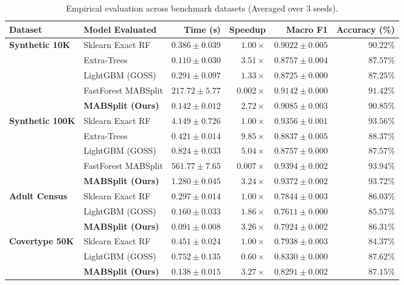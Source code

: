 \documentclass{article}
\begin{document}
	\begin{table}[htbp]
		\centering
		\small
		\caption{Empirical evaluation across benchmark datasets (Averaged over 3 seeds).}
		\label{tab:main_results}
		\begin{tabularx}{\textwidth}{llrrrr}
			\toprule
			\textbf{Dataset} & \textbf{Model Evaluated} & \textbf{Time (s)} & \textbf{Speedup} & \textbf{Macro F1} & \textbf{Accuracy (\%)} \\
			\midrule
			\textbf{Synthetic 10K} & Sklearn Exact RF & $0.386 \pm 0.039$ & $1.00\times$ & $0.9022 \pm 0.005$ & $90.22\%$ \\
			& Extra-Trees & $0.110 \pm 0.030$ & $3.51\times$ & $0.8757 \pm 0.004$ & $87.57\%$ \\
			& LightGBM (GOSS) & $0.291 \pm 0.097$ & $1.33\times$ & $0.8725 \pm 0.000$ & $87.25\%$ \\
			& FastForest MABSplit & $217.72 \pm 5.77$ & $0.002\times$ & $0.9142 \pm 0.000$ & $91.42\%$ \\
			& \textbf{MABSplit (Ours)} & $\mathbf{0.142 \pm 0.012}$ & $\mathbf{2.72\times}$ & $\mathbf{0.9085 \pm 0.003}$ & $\mathbf{90.85\%}$ \\
			\midrule
			\textbf{Synthetic 100K} & Sklearn Exact RF & $4.149 \pm 0.726$ & $1.00\times$ & $0.9356 \pm 0.001$ & $93.56\%$ \\
			& Extra-Trees & $0.421 \pm 0.014$ & $9.85\times$ & $0.8837 \pm 0.005$ & $88.37\%$ \\
			& LightGBM (GOSS) & $0.824 \pm 0.033$ & $5.04\times$ & $0.8757 \pm 0.000$ & $87.57\%$ \\
			& FastForest MABSplit & $561.77 \pm 7.65$ & $0.007\times$ & $0.9394 \pm 0.002$ & $93.94\%$ \\
			& \textbf{MABSplit (Ours)} & $\mathbf{1.280 \pm 0.045}$ & $\mathbf{3.24\times}$ & $\mathbf{0.9372 \pm 0.002}$ & $\mathbf{93.72\%}$ \\
			\midrule
			\textbf{Adult Census} & Sklearn Exact RF & $0.297 \pm 0.014$ & $1.00\times$ & $0.7844 \pm 0.003$ & $86.03\%$ \\
			& LightGBM (GOSS) & $0.160 \pm 0.033$ & $1.86\times$ & $0.7611 \pm 0.000$ & $85.57\%$ \\
			& \textbf{MABSplit (Ours)} & $\mathbf{0.091 \pm 0.008}$ & $\mathbf{3.26\times}$ & $\mathbf{0.7924 \pm 0.002}$ & $\mathbf{86.31\%}$ \\
			\midrule
			\textbf{Covertype 50K} & Sklearn Exact RF & $0.451 \pm 0.024$ & $1.00\times$ & $0.7938 \pm 0.003$ & $84.37\%$ \\
			& LightGBM (GOSS) & $0.752 \pm 0.135$ & $0.60\times$ & $0.8330 \pm 0.000$ & $87.62\%$ \\
			& \textbf{MABSplit (Ours)} & $\mathbf{0.138 \pm 0.015}$ & $\mathbf{3.27\times}$ & $\mathbf{0.8291 \pm 0.002}$ & $\mathbf{87.15\%}$ \\
			\bottomrule
		\end{tabularx}
	\end{table}
\end{document}
